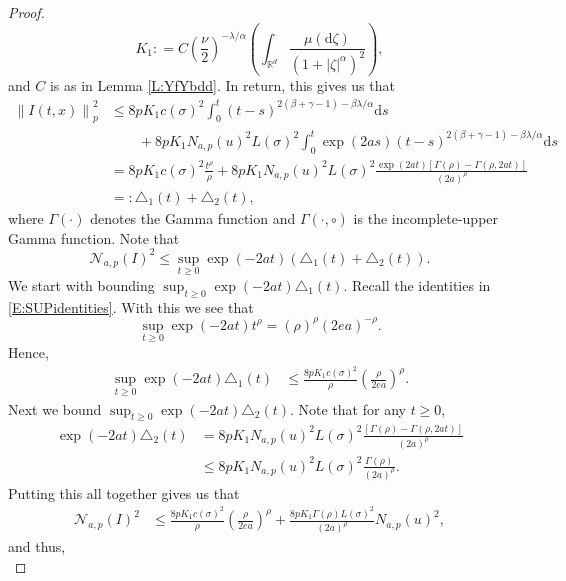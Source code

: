\documentclass[a4paper,11pt]{article}
\numberwithin{equation}{section}
\theoremstyle{plain}
\theoremstyle{definition}
\newcommand{\ud}{\ensuremath{\mathrm{d} }}
\newcommand{\Norm}[1]{\left\|  #1   \right\|}
\newcommand{\R}{\mathbb{R}}
\numberwithin{NQ}{section}
\numberwithin{LQ}{section}
\numberwithin{ZQ}{section}
\begin{document}
\begin{proof}
\begin{equation}
	K_1 : = C \left(\frac{\nu}{2}\right)^{-\lambda/\alpha}\left(\int_{\R^d} \frac{\mu(\ud \zeta)}{\left(1 + |\zeta|^{\alpha}\right)^2 }\right),
	\end{equation}
  and $C$ is as in Lemma \ref{L:YfYbdd}. In return, this gives us that
	\begin{align*}
    \Norm{I(t,x)}_p^2 & \le  8p K_1 c(\sigma)^2 \int_0^t (t-s)^{2(\beta + \gamma -1)-\beta \lambda /\alpha} \ud s                                                                  \\
                      & \qquad + 8p K_1 N_{a,p}(u)^2 L(\sigma)^2\int_0^t \exp(2as) (t-s)^{2(\beta + \gamma -1)-\beta \lambda /\alpha} \ud s                                        \\
                      & = 8p K_1 c(\sigma)^2\frac{ t ^ \rho}{\rho} + 8p K_1 N_{a,p}(u)^2 L(\sigma)^2 \frac{\exp(2at) \left[ \Gamma(\rho) - \Gamma(\rho, 2at)\right]}{(2a)^{\rho} } \\
                      & =: \triangle_1(t) + \triangle_2(t),
	\end{align*}
  where $\Gamma(\cdot)$ denotes the Gamma function and $\Gamma(\cdot ,\circ)$ is the
  incomplete-upper Gamma function. Note that
	\[
	\mathcal{N}_{a,p}(I)^2 \le \sup_{t \ge 0} \exp(-2at)\left( \triangle_1(t) + \triangle_2(t) \right).
	\]
  We start with bounding $\sup_{t \ge 0} \exp(-2at)\triangle_1(t)$. Recall the identities in
  \eqref{E:SUPidentities}. With this we see that
	\[
	\sup_{t \ge 0} \exp(-2at) t^{\rho} = (\rho)^{\rho} (2ea)^{-\rho}.
	\]
  Hence,
	\begin{align*}
	\sup_{t \ge 0} \exp(-2at)\triangle_1(t) & \le \frac{8p K_1 c(\sigma)^2}{\rho} \left(\frac{\rho}{2ea}\right)^{\rho}.
	\end{align*}
  Next we bound $\sup_{t \ge 0} \exp(-2at)\triangle_2(t)$. Note that for any $t\ge 0$,
	\begin{align*}
	\exp(-2at)\triangle_2(t) &= 8p K_1 N_{a,p}(u)^2 L(\sigma)^2 \frac{\left[ \Gamma(\rho) - \Gamma(\rho, 2at) \right]}{(2a)^\rho} \\
	& \le  8p K_1 N_{a,p}(u)^2 L(\sigma)^2 \frac{\Gamma(\rho)}{(2a)^{\rho}}.
	\end{align*}
  Putting this all together gives us that
	\begin{align*}
	\mathcal{N}_{a,p}(I)^2 &\le \frac{8p K_1 c(\sigma)^2}{\rho} \left(\frac{\rho}{2ea}\right)^{\rho}  + \frac{8p K_1 \Gamma(\rho) L(\sigma)^2}{ (2a)^{\rho}}N_{a,p}(u)^2,
	\end{align*}
  and thus,
	\begin{equation*}

\end{equation*}
\end{proof}
\end{document}
